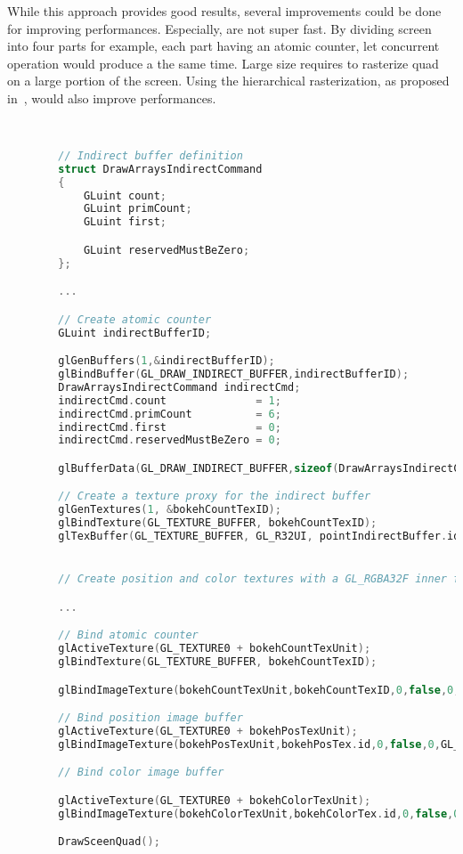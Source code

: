 While this approach provides good results, several improvements could be done for improving performances. Especially,  are not super fast. By dividing screen into four parts for example, each part having an atomic counter, let concurrent operation would produce a the same time. Large \coc size requires to rasterize quad on a large portion of the screen. Using the hierarchical rasterization, as proposed in~\cite{Futurmark11}, would also improve performances.



\begin{lstlisting}[language=C++,float={htb},caption={Initialization and drawing for extracting bokehs.},label={YourName:bokehextraction}]


		// Indirect buffer definition
		struct DrawArraysIndirectCommand
		{
			GLuint count;
			GLuint primCount;
			GLuint first;

			GLuint reservedMustBeZero;
		};

		...

		// Create atomic counter
		GLuint indirectBufferID;

		glGenBuffers(1,&indirectBufferID);
		glBindBuffer(GL_DRAW_INDIRECT_BUFFER,indirectBufferID);
		DrawArraysIndirectCommand indirectCmd;
		indirectCmd.count              = 1;
		indirectCmd.primCount          = 6;
		indirectCmd.first              = 0;
		indirectCmd.reservedMustBeZero = 0;

		glBufferData(GL_DRAW_INDIRECT_BUFFER,sizeof(DrawArraysIndirectCommand),&indirecCmd,GL_DYNAMIC_DRAW);

		// Create a texture proxy for the indirect buffer
		glGenTextures(1, &bokehCountTexID);
		glBindTexture(GL_TEXTURE_BUFFER, bokehCountTexID);
		glTexBuffer(GL_TEXTURE_BUFFER, GL_R32UI, pointIndirectBuffer.id);


		// Create position and color textures with a GL_RGBA32F inner format

		...

		// Bind atomic counter
		glActiveTexture(GL_TEXTURE0 + bokehCountTexUnit);
		glBindTexture(GL_TEXTURE_BUFFER, bokehCountTexID);

		glBindImageTexture(bokehCountTexUnit,bokehCountTexID,0,false,0,GL_READ_WRITE,GL_R32UI);

		// Bind position image buffer
		glActiveTexture(GL_TEXTURE0 + bokehPosTexUnit);
		glBindImageTexture(bokehPosTexUnit,bokehPosTex.id,0,false,0,GL_READ_WRITE,GL_RGBA32F);

		// Bind color image buffer

		glActiveTexture(GL_TEXTURE0 + bokehColorTexUnit);
		glBindImageTexture(bokehColorTexUnit,bokehColorTex.id,0,false,0,GL_READ_WRITE,GL_RGBA32F);

		DrawSceenQuad();
\end{lstlisting}


